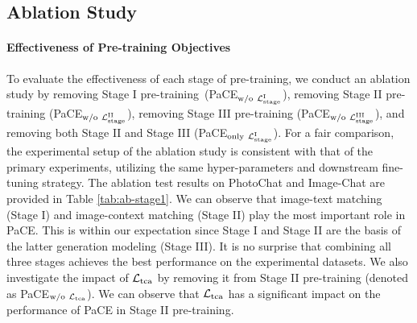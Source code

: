 \documentclass[11pt]{article}
\begin{document}
\begin{table}[t!]
    \centering
    \small
    \caption{
    Multi-modal response generation performances on MMConv.
    }
    \label{tab:ap-mmconvrg}
\end{table}


\subsection{Ablation Study}
\paragraph{Effectiveness of Pre-training Objectives}
To evaluate the effectiveness of each stage of pre-training, we conduct an ablation study by removing Stage I pre-training~(PaCE$_{\rm w/o~\footnotesize{\mathcal{L}_{\rm stage}^{\rm I}}}$), removing Stage II pre-training (PaCE$_{\rm w/o~\footnotesize{\mathcal{L}_{\rm stage}^{\rm II}}}$), removing Stage III pre-training (PaCE$_{\rm w/o~\footnotesize{\mathcal{L}_{\rm stage}^{\rm III}}}$), and removing both Stage II and Stage III (PaCE$_{\rm only~\footnotesize{\mathcal{L}_{\rm stage}^{\rm I}}}$). For a fair comparison, the experimental setup of the ablation study is consistent with that of the primary experiments, utilizing the same hyper-parameters and downstream fine-tuning strategy. The ablation test results on PhotoChat and Image-Chat are provided in Table \ref{tab:ab-stage1}. We can observe that  image-text matching (Stage I) and image-context matching (Stage II) play the most important role in PaCE.
This is within our expectation since Stage I and Stage II are the basis of the latter generation modeling (Stage III). It is no surprise that combining all three stages achieves the best performance on the experimental datasets.
We also investigate the impact of $\mathcal{L}_{\rm tca}$ by removing it from Stage II pre-training (denoted as PaCE$_{\rm w/o~\mathcal{L}_{\rm tca}}$). We can observe that
$\mathcal{L}_{\rm tca}$ has a significant impact on the performance of PaCE in Stage II pre-training.
\end{document}
